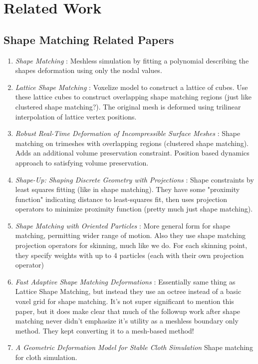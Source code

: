 \documentclass[sigconf]{acmart}
\begin{document}
\section{Related Work}
\subsection{Shape Matching Related Papers}
\begin{enumerate}
    \item \textit{Shape Matching} \cite{10.1145/1073204.1073216}: Meshless simulation by fitting a polynomial describing the shapes deformation using only the nodal values.
    \item \textit{Lattice Shape Matching} \cite{10.1145/1275808.1276480}: Voxelize model to construct a lattice of cubes. Use these lattice cubes to construct overlapping shape matching regions (just like clustered shape matching?). The original mesh is deformed using trilinear interpolation of lattice vertex positions.
    \item \textit{Robust Real-Time Deformation of Incompressible Surface Meshes} \cite{10.1145/2019406.2019438}: Shape matching on trimeshes with overlapping regions (clustered shape matching). Adds an additional volume preservation constraint. Position based dynamics approach to satisfying volume preservation.
    \item \textit{Shape-Up: Shaping Discrete Geometry with Projections} \cite{10.1111/j.1467-8659.2012.03171.x}: Shape constraints by least squares fitting (like in shape matching). They have some "proximity function" indicating distance to least-squares fit, then uses projection operators to minimize proximity function (pretty much just shape matching). 
    \item \textit{Shape Matching with Oriented Particles} \cite{10.1145/1964921.1964987}: More general form for shape matching, permitting wider range of motion. Also they use shape matching projection operators for skinning, much like we do. For each skinning point, they specify weights with up to 4 particles (each with their own projection operator)
    \item \textit{Fast Adaptive Shape Matching Deformations} \cite{10.5555/1632592.1632606}: Essentially same thing as Lattice Shape Matching, but instead they use an octree instead of a basic voxel grid for shape matching. It's not super significant to mention this paper, but it does make clear that much of the followup work after shape matching never didn't emphasize it's utility as a meshless boundary only method. They kept converting it to a mesh-based method!
    \item \textit{A Geometric Deformation Model for Stable Cloth Simulation} \cite{10.2312/PE/vriphys/vriphys08/039-046} Shape matching for cloth simulation.
\end{enumerate}
\end{document}
